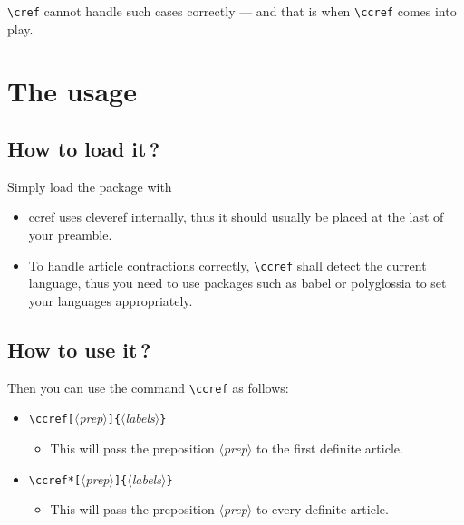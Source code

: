 \documentclass[classical]{einfart}
\providecommand{\meta}[1]{$\langle${\normalfont\itshape#1}$\rangle$}
\newenvironment{tip}[1][Tip]{%
    \LocallyStopLineNumbers%
    \begin{tcolorbox}[breakable,
        enhanced,
        width = \textwidth,
        colback = paper, colbacktitle = paper,
        colframe = gray!50, boxrule=0.2mm,
        coltitle = black,
        fonttitle = \sffamily,
        attach boxed title to top left = {yshift=-\tcboxedtitleheight/2, xshift=.5cm},
        boxed title style = {boxrule=0pt, colframe=paper},
        before skip = 0.3cm,
        after skip = 0.3cm,
        top = 3mm,
        bottom = 3mm,
        title={\scshape\sffamily #1}]%
}{\end{tcolorbox}\ResumeLineNumbers}
\newcommand{\ccrefpackage}{\textsf{ccref}}
\begin{document}
\lstinline|\cref| cannot handle such cases correctly --- and that is when \lstinline|\ccref| comes into play.


\section{The usage}

\subsection[How to load it]{How to load it\,?}

Simply load the package with

\begin{code}
\usepackage{ccref}
\end{code}

\begin{tip}
    \begin{itemize}\small
        \item \ccrefpackage{} uses \textsf{cleveref} internally, thus it should usually be placed at the last of your preamble.
        \item To handle article contractions correctly, \lstinline|\ccref| shall detect the current language, thus you need to use packages such as \textsf{babel} or \textsf{polyglossia} to set your languages appropriately.
    \end{itemize}
\end{tip}

\subsection[How to use it]{How to use it\,?}

Then you can use the command \lstinline|\ccref| as follows:
\begin{itemize}
    \item \lstinline|\ccref[|\meta{prep}\lstinline|]{|\meta{labels}\lstinline|}|
    \begin{itemize}
        \item This will pass the preposition \meta{prep} to the first definite article.
    \end{itemize}
    \item \lstinline|\ccref*[|\meta{prep}\lstinline|]{|\meta{labels}\lstinline|}|
    \begin{itemize}
        \item This will pass the preposition \meta{prep} to every definite article.
    \end{itemize}
\end{itemize}
\end{document}
